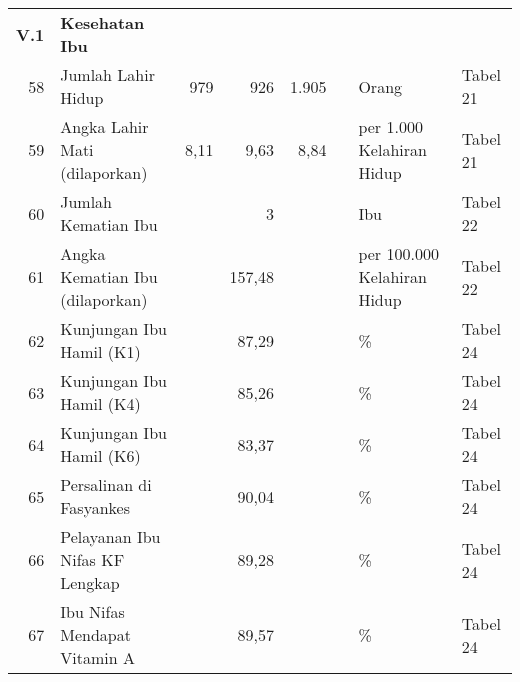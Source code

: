 \begin{small}
\begin{longtable}{rY{12em}rrrrY{5em}Y{5em}}
	         \textbf{V.1} & \textbf{Kesehatan Ibu}                                                                &        &        &         &                   &                                &          \\
	                   58 & Jumlah Lahir Hidup                                                                    &    979 &    926 &   1.905 &                   & Orang                          & Tabel 21 \\
	 59 & Angka Lahir Mati (dilaporkan)                                                         &   8,11 &   9,63 &    8,84 &                   & per 1.000 Kelahiran Hidup      & Tabel 21 \\
	                   60 & Jumlah Kematian Ibu                                                                   &        &      3 &         &                   & Ibu                            & Tabel 22 \\
	 61 & Angka Kematian Ibu (dilaporkan)                                                       &        & 157,48 &         &                   & per 100.000 Kelahiran Hidup    & Tabel 22 \\
	                   62 & Kunjungan Ibu Hamil (K1)                                                              &        &  87,29 &         &                   & \%                             & Tabel 24 \\
	 63 & Kunjungan Ibu Hamil (K4)                                                              &        &  85,26 &         &                   & \%                             & Tabel 24 \\
	                   64 & Kunjungan Ibu Hamil (K6)                                                              &        &  83,37 &         &                   & \%                             & Tabel 24 \\
	 65 & Persalinan di Fasyankes                                                               &        &  90,04 &         &                   & \%                             & Tabel 24 \\
	                   66 & Pelayanan Ibu Nifas KF Lengkap                                                        &        &  89,28 &         &                   & \%                             & Tabel 24 \\
	 67 & Ibu Nifas Mendapat Vitamin A                                                          &        &  89,57 &         &                   & \%                             & Tabel 24 \\

\end{longtable}
\end{small}
